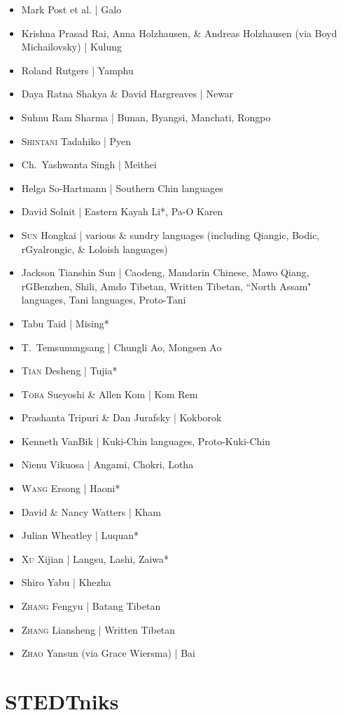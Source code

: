 \begin{itemize}
\item Mark Post et al. | Galo
\item Krishna Prasad Rai, Anna Holzhausen, \& Andreas Holzhausen (via Boyd Michailovsky) | Kulung
\item Roland Rutgers | Yamphu
\item Daya Ratna Shakya \& David Hargreaves | Newar
\item Suhnu Ram Sharma | Bunan, Byangsi, Manchati, Rongpo
\item \textsc{Shintani} Tadahiko | Pyen
\item Ch.\ Yashwanta Singh | Meithei
\item Helga So-Hartmann | Southern Chin languages
\item David Solnit | Eastern Kayah Li*, Pa-O Karen
\item \textsc{Sun} Hongkai | various \& sundry languages (including Qiangic, Bodic, rGyalrongic, \& Loloish languages)
\item Jackson Tianshin Sun | Caodeng, Mandarin Chinese, Mawo Qiang, rGBenzhen, Shili, Amdo Tibetan, Written Tibetan, ``North Assam" languages, Tani languages, Proto-Tani
\item Tabu Taid | Mising*
\item T.\ Temsunungsang | Chungli Ao, Mongsen Ao
\item \textsc{Tian} Desheng | Tujia*
\item \textsc{Toba} Sueyoshi \& Allen Kom | Kom Rem
\item Prashanta Tripuri \& Dan Jurafsky | Kokborok
\item Kenneth VanBik | Kuki-Chin languages, Proto-Kuki-Chin
\item Nienu Vikuosa | Angami, Chokri, Lotha
\item \textsc{Wang} Ersong | Haoni*
\item David \& Nancy Watters | Kham
\item Julian Wheatley | Luquan*
\item \textsc{Xu} Xijian | Langsu, Lashi, Zaiwa*
\item Shiro Yabu | Khezha
\item \textsc{Zhang} Fengyu | Batang Tibetan
\item \textsc{Zhang} Liansheng | Written Tibetan
\item \textsc{Zhao} Yansun (via Grace Wiersma) | Bai
\end{itemize}


\section{STEDTniks}

